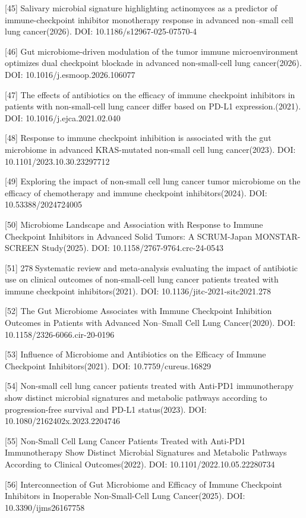 \documentclass[11pt]{article}
\begin{document}
{[}45{]} Salivary microbial signature highlighting actinomyces as a predictor of immune-checkpoint inhibitor monotherapy response in advanced non--small cell lung cancer(2026). DOI: 10.1186/s12967-025-07570-4

{[}46{]} Gut microbiome-driven modulation of the tumor immune microenvironment optimizes dual checkpoint blockade in advanced non-small-cell lung cancer(2026). DOI: 10.1016/j.esmoop.2026.106077

{[}47{]} The effects of antibiotics on the efficacy of immune checkpoint inhibitors in patients with non-small-cell lung cancer differ based on PD-L1 expression.(2021). DOI: 10.1016/j.ejca.2021.02.040

{[}48{]} Response to immune checkpoint inhibition is associated with the gut microbiome in advanced KRAS-mutated non-small cell lung cancer(2023). DOI: 10.1101/2023.10.30.23297712

{[}49{]} Exploring the impact of non-small cell lung cancer tumor microbiome on the efficacy of chemotherapy and immune checkpoint inhibitors(2024). DOI: 10.53388/2024724005

{[}50{]} Microbiome Landscape and Association with Response to Immune Checkpoint Inhibitors in Advanced Solid Tumors: A SCRUM-Japan MONSTAR-SCREEN Study(2025). DOI: 10.1158/2767-9764.crc-24-0543

{[}51{]} 278 Systematic review and meta-analysis evaluating the impact of antibiotic use on clinical outcomes of non-small-cell lung cancer patients treated with immune checkpoint inhibitors(2021). DOI: 10.1136/jitc-2021-sitc2021.278

{[}52{]} The Gut Microbiome Associates with Immune Checkpoint Inhibition Outcomes in Patients with Advanced Non--Small Cell Lung Cancer(2020). DOI: 10.1158/2326-6066.cir-20-0196

{[}53{]} Influence of Microbiome and Antibiotics on the Efficacy of Immune Checkpoint Inhibitors(2021). DOI: 10.7759/cureus.16829

{[}54{]} Non-small cell lung cancer patients treated with Anti-PD1 immunotherapy show distinct microbial signatures and metabolic pathways according to progression-free survival and PD-L1 status(2023). DOI: 10.1080/2162402x.2023.2204746

{[}55{]} Non-Small Cell Lung Cancer Patients Treated with Anti-PD1 Immunotherapy Show Distinct Microbial Signatures and Metabolic Pathways According to Clinical Outcomes(2022). DOI: 10.1101/2022.10.05.22280734

{[}56{]} Interconnection of Gut Microbiome and Efficacy of Immune Checkpoint Inhibitors in Inoperable Non-Small-Cell Lung Cancer(2025). DOI: 10.3390/ijms26167758
\end{document}
